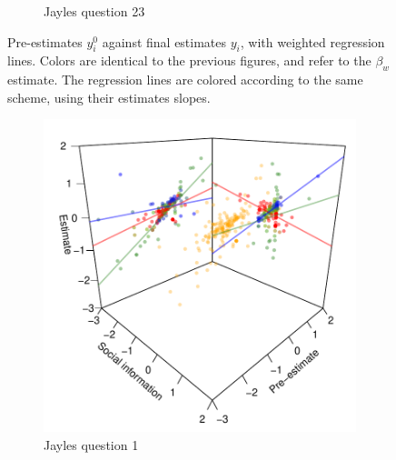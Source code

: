 \documentclass[9pt,twoside,lineno]{pnas-new}
\begin{document}
\begin{figure}[htbp]
\begin{subfigure}[b]{.24\textwidth}
		\caption{Jayles question 23}
	\end{subfigure}
	\caption{Pre-estimates $y_i^0$ against final estimates $y_i$, with weighted regression lines. Colors are identical to the previous figures, and refer to the $\beta_w$ estimate. The regression lines are colored according to the same scheme, using their estimates slopes.}\label{fig: Jayles estimate vs pre-estimate}
\end{figure}


\begin{figure}[htbp]
	\centering
	\begin{subfigure}[b]{.24\textwidth}
		\includegraphics[width=\textwidth]{../plots/jayles1_vs_xp3d.pdf}
		\caption{Jayles question 1}
	\end{subfigure}
	\begin{subfigure}[b]{.24\textwidth}

\end{subfigure}
\end{figure}
\end{document}
